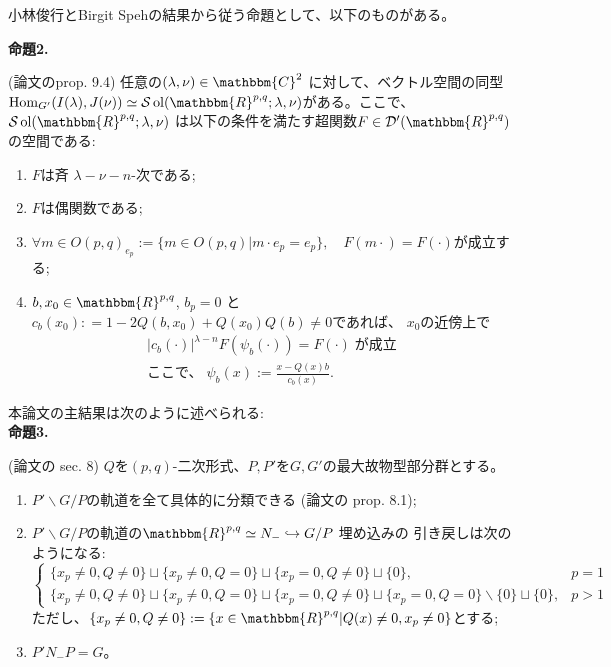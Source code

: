 \documentclass[a4paper]{article} %
\newcommand{\assign}{:=}
\newcommand{\tmop}[1]{\ensuremath{\operatorname{#1}}}
\newcommand{\tmtextbf}[1]{{\bfseries{#1}}}
\newcommand{\tmtextit}[1]{{\itshape{#1}}}
\begin{document}
{\noindent}小林俊行とBirgit Spehの結果から従う命題として、以下のものがある。

{\noindent}\textbf{命題\textbf{2}.}\tmtextit{(論文のprop. 9.4)
任意の$( \lambda, \nu) \in \mathbbm{C}^2$ に対して、ベクトル空間の同型 $\tmop{Hom}_{G'} ( I (
\lambda), J ( \nu)) \simeq \mathcal{S} \tmop{ol} ( \mathbbm{R}^{p, q} ;
\lambda, \nu)$がある。ここで、$\mathcal{S} \tmop{ol} ( \mathbbm{R}^{p, q} ; \lambda,
\nu)$ は以下の条件を満たす超関数$F \in \mathcal{D}' (
\mathbbm{R}^{p, q})$の空間である:
\begin{enumerate}
 \item $F$は斉 $\lambda-\nu-n$-次である;
 \item $F$は偶関数である;
\item $\forall m \in O ( p, q)_{e_p} \assign \{ m \in O ( p, q) | m \cdot e_p = e_p \},\quad F ( m \cdot) = F ( \cdot)$が成立する;
 \item $b, x_0 \in \mathbbm{R}^{p, q}$, $b_p = 0$ と $c_b
 ( x_0) : = 1 - 2 Q ( b, x_0) + Q ( x_0) Q ( b) \neq 0$であれば、 $x_0$の近傍上で
\begin{eqnarray}
& | c_b ( \cdot) |^{\lambda - n} F ( \psi_b ( \cdot)) = F (\cdot)
\;　\mbox{が成立}& \nonumber\\
& \mbox{ここで、}\;\psi_b ( x) \assign \frac{x - Q (x) b}{c_b ( x)} . & \nonumber
\end{eqnarray}
\end{enumerate}}

{\noindent}本論文の主結果は次のように述べられる:\\

{\noindent}\tmtextbf{命題\textbf{3}.}\tmtextit{(論文の sec. 8)
$Q$を$(p,q)$-二次形式、$P,P'$を$G,G'$の最大故物型部分群とする。
\begin{enumerate}
 \item $P' \backslash G/ P$の軌道を全て具体的に分類できる (論文の
prop. 8.1);
 \item $P' \backslash G/P$の軌道の$\mathbbm{R}^{p, q} \simeq N_- \hookrightarrow G / P$ 埋め込みの
引き戻しは次のようになる:
 \[ \left\{ \begin{array}{ll}
 \{ x_p \neq 0, Q \neq 0 \} \sqcup \{ x_p \neq 0, Q = 0 \} \sqcup \{ x_p
 = 0, Q \neq 0 \} \sqcup \{ 0 \}, & p = 1\\
 \{ x_p \neq 0, Q \neq 0 \} \sqcup \{ x_p \neq 0, Q = 0 \} \sqcup \{ x_p
 = 0, Q \neq 0 \} \sqcup \{ x_p = 0, Q = 0 \} \backslash \{ 0 \} \sqcup
 \{ 0 \}, & p > 1
 \end{array} \right. \]
 ただし、$\{ x_p \neq 0, Q \neq 0 \} \assign \{ x \in \mathbbm{R}^{p, q} |
 Q ( x) \neq 0, x_p \neq 0 \}$とする;
 
 \item $P' N_- P = G$。
\end{enumerate}}
\end{document}
